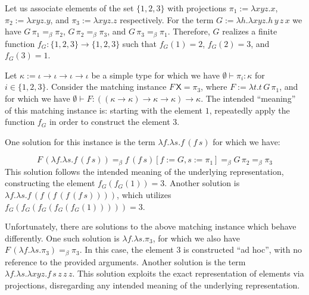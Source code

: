 \documentclass[10pt,a4paper]{amsart}
\begin{document}
 
Let us associate elements of the set $\{1,2,3\}$ with projections $\pi_{1}:=\lambda xyz.x$, $\pi_{2}:=\lambda xyz.y$, and $\pi_{3}:=\lambda xyz.z$ respectively. For the term $G:=\lambda h.\lambda xyz.h\,y\,z\,x$ we have $G\,\pi_{1}=_{\beta}\pi_{2}$, $G\,\pi_{2}=_{\beta}\pi_{3}$, and $G\,\pi_{3}=_{\beta}\pi_{1}$. Therefore, $G$ realizes a finite function $f_{G}:\{1,2,3\}\to\{1,2,3\}$ such that $f_{G}(1)=2$, $f_{G}(2)=3$, and $f_{G}(3)=1$.\par
 
 
 
Let $\kappa:=\iota\to\iota\to\iota\to\iota$ be a simple type for which we have $\emptyset\vdash\pi_{i}:\kappa$ for $i\in\{1,2,3\}$. Consider the matching instance $F\,\mathsf{X}=\pi_{3}$, where $F:=\lambda t.t\,G\,\pi_{1}$, and for which we have $\emptyset\vdash F:((\kappa\to\kappa)\to\kappa\to\kappa)\to\kappa$. The intended “meaning” of this matching instance is: starting with the element $1$, repeatedly apply the function $f_{G}$ in order to construct the element $3$.\par
 
 
 
One solution for this instance is the term $\lambda f.\lambda s.f\,(f\,s)$ for which we have:\par
    \[F\,(\lambda f.\lambda s.f\,(f\,s))=_{\beta}f\,(f\,s)[f:=G,s:=\pi_{1}]=_{\beta}%
G\,\pi_{2}=_{\beta}\pi_{3}\]    
This solution follows the intended meaning of the underlying representation, constructing the element $f_{G}(f_{G}(1))=3$. Another solution is $\lambda f.\lambda s.f\,(f\,(f\,(f\,(f\,s))))$, which utilizes $f_{G}(f_{G}(f_{G}(f_{G}(f_{G}(1)))))=3$.\par
 
 
 
Unfortunately, there are solutions to the above matching instance which behave differently. One such solution is $\lambda f.\lambda s.\pi_{3}$, for which we also have $F\,(\lambda f.\lambda s.\pi_{3})=_{\beta}\pi_{3}$. In this case, the element $3$ is constructed “ad hoc”, with no reference to the provided arguments. Another solution is the term $\lambda f.\lambda s.\lambda xyz.f\,s\,z\,z\,z$. This solution exploits the exact representation of elements via projections, disregarding any intended meaning of the underlying representation.\par
 
\end{document}
